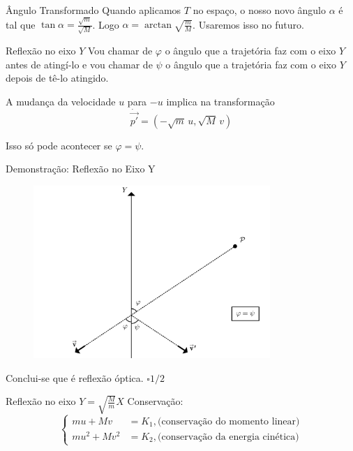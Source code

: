 \documentclass{beamer}
\begin{document}
\begin{frame}{Ângulo Transformado}
  Quando aplicamos $T$ no espaço, o nosso novo ângulo $\alpha$ é tal que $\tan{\alpha}=\frac{\sqrt{m}}{\sqrt{M}}$. Logo $\alpha = \arctan{\sqrt{\frac{m}{M}}}$. Usaremos isso no futuro.
\end{frame}

\begin{frame}{Reflexão no eixo $Y$}
  Vou chamar de $\varphi$ o ângulo que a trajetória faz com o eixo $Y$ antes de atingí-lo e vou chamar de $\psi$ o ângulo que a trajetória faz com o eixo $Y$ depois de tê-lo atingido. 
  
  A mudança da velocidade $u$ para $-u$ implica na transformação 
  \begin{equation*}
    \dot{\vec{p'}}=(-\sqrt m\,u,\sqrt M\,v)
  \end{equation*}

  Isso só pode acontecer se $\varphi=\psi$.
\end{frame}

\begin{frame}{Demonstração: Reflexão no Eixo Y}
  \begin{figure}
    \centering
    \includegraphics[width=0.8\textwidth]{images/image-4.png}
  \end{figure}
  Conclui-se que é reflexão óptica. $\square 1/2$ 
\end{frame}

\begin{frame}{Reflexão no eixo $Y=\sqrt{\tfrac{M}{m}}X$}
  Conservação:
  \begin{equation*}
    \begin{cases}mu+Mv&=K_1,\text{(conservação do momento linear)} \\mu^2+Mv^2&=K_2,\text{(conservação da energia cinética)} \end{cases}
  \end{equation*}
\end{frame}
\end{document}
